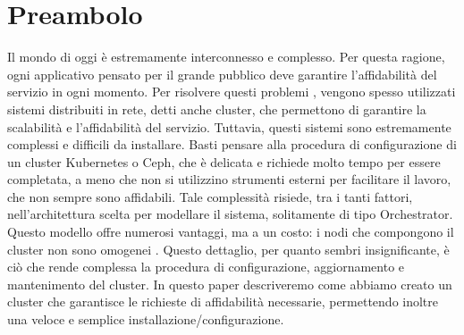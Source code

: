 
\section{Preambolo}
Il mondo di oggi è estremamente interconnesso e complesso. Per questa ragione, ogni applicativo pensato per il grande pubblico deve garantire l'affidabilità del servizio in ogni momento. Per risolvere questi problemi %
, vengono spesso utilizzati sistemi distribuiti in rete, detti anche cluster, che permettono di garantire la scalabilità e l'affidabilità del servizio. Tuttavia, questi sistemi sono estremamente complessi e difficili da installare. Basti pensare alla procedura di configurazione di un cluster Kubernetes o Ceph, che è delicata e richiede molto tempo per essere completata, a meno che non si utilizzino strumenti esterni %
per facilitare il lavoro, che non sempre sono affidabili. Tale complessità risiede, tra i tanti fattori, nell'architettura scelta per modellare il sistema, solitamente di tipo Orchestrator. Questo modello offre numerosi vantaggi, ma a un costo: i nodi che compongono il cluster non sono omogenei %
. Questo dettaglio, per quanto sembri insignificante, è ciò che rende complessa la procedura di configurazione, aggiornamento e mantenimento del cluster. In questo paper descriveremo come abbiamo creato un cluster che garantisce le richieste di affidabilità necessarie, permettendo inoltre una veloce e semplice installazione/configurazione.
